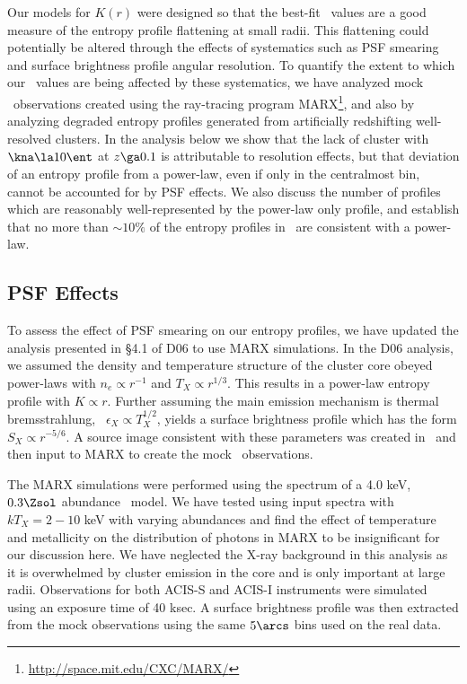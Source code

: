 Our models for $K(r)$ were designed so that the best-fit \kna\ values
are a good measure of the entropy profile flattening at small
radii. This flattening could potentially be altered through the
effects of systematics such as PSF smearing and surface brightness
profile angular resolution. To quantify the extent to which our
\kna\ values are being affected by these systematics, we have analyzed
mock \chandra\ observations created using the ray-tracing program
MARX\footnote{\url{http://space.mit.edu/CXC/MARX/}}, and also by
analyzing degraded entropy profiles generated from artificially
redshifting well-resolved clusters. In the analysis below we show that
the lack of cluster with $\kna \la 10 \ent$ at $z \ga 0.1$ is
attributable to resolution effects, but that deviation of an entropy
profile from a power-law, even if only in the centralmost bin, cannot
be accounted for by PSF effects. We also discuss the number of
profiles which are reasonably well-represented by the power-law only
profile, and establish that no more than $\sim 10\%$ of the entropy
profiles in
\accept\ are consistent with a power-law.

\subsection{PSF Effects}
\label{sec:entsupppsf}

To assess the effect of PSF smearing on our entropy profiles, we have
updated the analysis presented in \S4.1 of D06 to use MARX
simulations. In the D06 analysis, we assumed the density and
temperature structure of the cluster core obeyed power-laws with $n_e
\propto r^{-1}$ and $T_X \propto r^{1/3}$. This results in a power-law
entropy profile with $K \propto r$. Further assuming the main emission
mechanism is thermal bremsstrahlung, \ie\ $\epsilon_X \propto
T_X^{1/2}$, yields a surface brightness profile which has the form
$S_X \propto r^{-5/6}$. A source image consistent with these
parameters was created in \idl\ and then input to MARX to create the
mock \chandra\ observations.

The MARX simulations were performed using the spectrum of a 4.0 keV,
$0.3 \Zsol$ abundance \mekal\ model. We have tested using input
spectra with $kT_X = 2-10$ keV with varying abundances and find the
effect of temperature and metallicity on the distribution of photons
in MARX to be insignificant for our discussion here. We have neglected
the X-ray background in this analysis as it is overwhelmed by cluster
emission in the core and is only important at large
radii. Observations for both ACIS-S and ACIS-I instruments were
simulated using an exposure time of 40 ksec. A surface brightness
profile was then extracted from the mock observations using the same
$5\arcs$ bins used on the real data.

